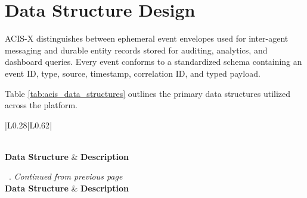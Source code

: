 \documentclass[a4paper, 12pt]{report}
\renewcommand{\thetable}{\thechapter.\arabic{table}}
\begin{document}
\section{Data Structure Design}
ACIS-X distinguishes between ephemeral event envelopes used for inter-agent messaging and durable entity records stored for auditing, analytics, and dashboard queries. Every event conforms to a standardized schema containing an event ID, type, source, timestamp, correlation ID, and typed payload.

Table \ref{tab:acis_data_structures} outlines the primary data structures utilized across the platform.

\vspace{-4pt}
\begin{longtable}{|L{0.28\textwidth}|L{0.62\textwidth}|}
    \caption{Data Structures Used in ACIS-X}\label{tab:acis_data_structures} \\

    \hline
    \textbf{Data Structure} & \textbf{Description} \\
    \hline
    \endfirsthead

    {\tablename\ \thetable\: \textit{Continued from previous page}} \\
    \hline
    \textbf{Data Structure} & \textbf{Description} \\
    \hline
    \endhead

    \hline {} \\
    \endfoot

    \hline
    \endlastfoot


\end{longtable}
\end{document}
